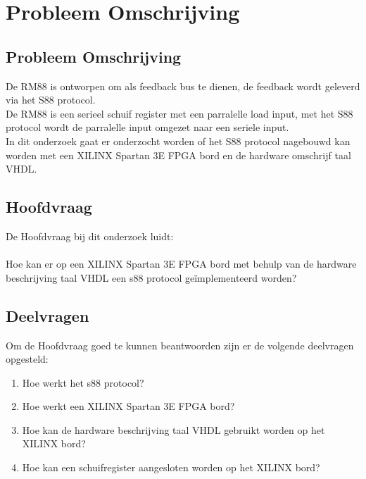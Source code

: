 \chapter{Probleem Omschrijving}
\section{Probleem Omschrijving}

De RM88 is ontworpen om als feedback bus te dienen, de feedback wordt geleverd via het S88 protocol.\\
De RM88 is een serieel schuif register met een parralelle load input, met het S88 protocol wordt de parralelle input omgezet naar een seriele input.\\
In dit onderzoek gaat er onderzocht worden of het S88 protocol nagebouwd kan worden met een XILINX Spartan 3E FPGA bord en de hardware omschrijf taal VHDL.


\section{Hoofdvraag}
De Hoofdvraag bij dit onderzoek luidt:
\\\\
Hoe kan er op een XILINX Spartan 3E FPGA bord met behulp van de hardware beschrijving taal VHDL een s88 protocol geïmplementeerd worden?
\\

\section{Deelvragen}
Om de Hoofdvraag goed te kunnen beantwoorden zijn er de volgende deelvragen opgesteld:

\begin{enumerate}
	\item Hoe werkt het s88 protocol?
	\item Hoe werkt een XILINX Spartan 3E FPGA bord?
	\item Hoe kan de hardware beschrijving taal VHDL gebruikt worden op het XILINX bord?
	\item Hoe kan een schuifregister aangesloten worden op het XILINX bord?
\end{enumerate}
